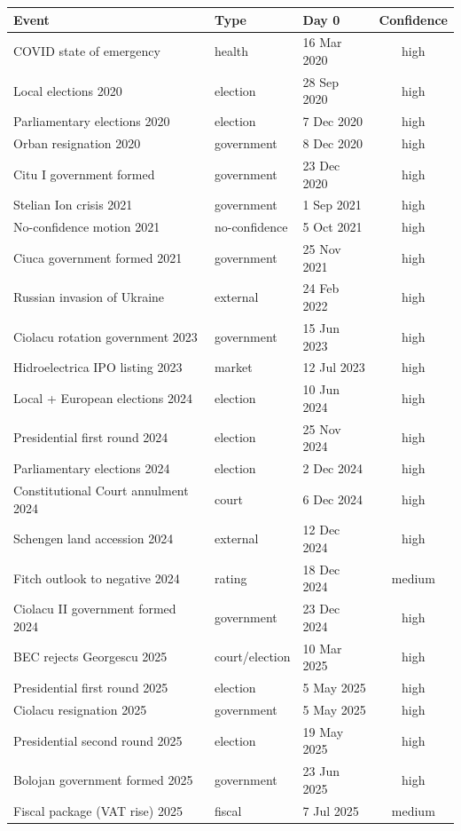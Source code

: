 \begin{tabular}{lllc}
\toprule
Event & Type & Day 0 & Confidence \\
\midrule
COVID state of emergency & health & 16 Mar 2020 & high \\
Local elections 2020 & election & 28 Sep 2020 & high \\
Parliamentary elections 2020 & election & 7 Dec 2020 & high \\
Orban resignation 2020 & government & 8 Dec 2020 & high \\
Citu I government formed & government & 23 Dec 2020 & high \\
Stelian Ion crisis 2021 & government & 1 Sep 2021 & high \\
No-confidence motion 2021 & no-confidence & 5 Oct 2021 & high \\
Ciuca government formed 2021 & government & 25 Nov 2021 & high \\
Russian invasion of Ukraine & external & 24 Feb 2022 & high \\
Ciolacu rotation government 2023 & government & 15 Jun 2023 & high \\
Hidroelectrica IPO listing 2023 & market & 12 Jul 2023 & high \\
Local + European elections 2024 & election & 10 Jun 2024 & high \\
Presidential first round 2024 & election & 25 Nov 2024 & high \\
Parliamentary elections 2024 & election & 2 Dec 2024 & high \\
Constitutional Court annulment 2024 & court & 6 Dec 2024 & high \\
Schengen land accession 2024 & external & 12 Dec 2024 & high \\
Fitch outlook to negative 2024 & rating & 18 Dec 2024 & medium \\
Ciolacu II government formed 2024 & government & 23 Dec 2024 & high \\
BEC rejects Georgescu 2025 & court/election & 10 Mar 2025 & high \\
Presidential first round 2025 & election & 5 May 2025 & high \\
Ciolacu resignation 2025 & government & 5 May 2025 & high \\
Presidential second round 2025 & election & 19 May 2025 & high \\
Bolojan government formed 2025 & government & 23 Jun 2025 & high \\
Fiscal package (VAT rise) 2025 & fiscal & 7 Jul 2025 & medium \\
\bottomrule
\end{tabular}
